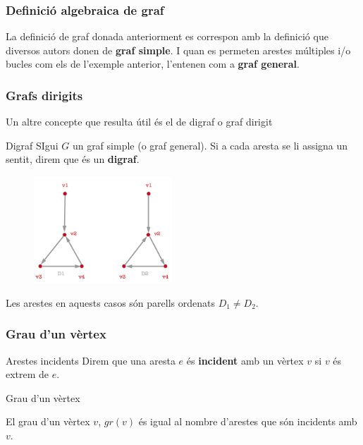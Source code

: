 \documentclass{beamer}
\begin{document}
\begin{frame}
\frametitle{Definició algebraica de graf}
La definició de graf donada anteriorment es correspon amb la definició que diversos autors donen de \textbf{graf simple}.  I quan es permeten arestes múltiples i/o bucles com els de l'exemple anterior, l'entenen com a \textbf{graf general}. 
\end{frame}



\begin{frame}
\frametitle{Grafs dirigits}
Un altre concepte que resulta útil és el de digraf o graf dirigit
\begin{block}{Digraf}
SIgui $G$ un graf simple (o graf general). Si a cada aresta se li assigna un sentit, direm que és un \textbf{digraf}. 

\end{block}

\begin{figure}[h]
 \label{fig:volum}
\centering
\includegraphics[height=4cm]{g5}
\end{figure}

Les arestes en aquests casos són parells ordenats $D_1\neq D_2$.

\end{frame}





\begin{frame}
\frametitle{Grau d'un vèrtex}

\begin{block}{Arestes incidents}
Direm que una aresta $e$ és \textbf{incident} amb un vèrtex $v$ si $v$ és extrem de $e$.
\end{block}

\begin{block}{Grau d'un vèrtex}

El grau d'un vèrtex $v$, $gr(v)$ és igual al nombre d'arestes que són incidents amb $v$.
\end{block}
\end{frame}
\end{document}
